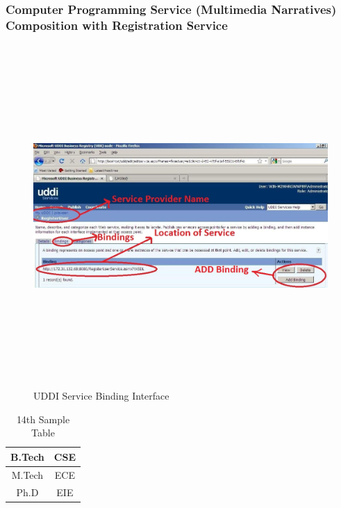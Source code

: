\subsubsection{Computer Programming Service (Multimedia Narratives) Composition with Registration Service}
\Blindtext
\begin{figure}[h!]
 \centering
 \includegraphics[width=16cm,height=13cm]{uddi_service_binding_interface.jpg}
 \caption{UDDI Service Binding Interface}
\end{figure}

\begin{table}
 \begin{center}
 \caption{14th Sample Table}
 \begin{tabular}{|c|c|}
 \hline
 B.Tech & CSE\\
 \hline
 M.Tech & ECE\\
 \hline
 Ph.D & EIE\\
 \hline 
 \end{tabular}
 \end{center}
\end{table}
